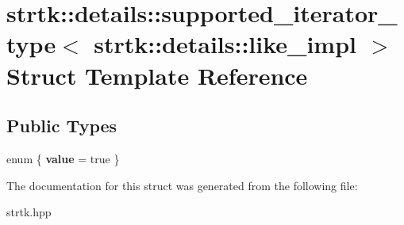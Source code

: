 \hypertarget{structstrtk_1_1details_1_1supported__iterator__type_3_01strtk_1_1details_1_1like__impl_01_4}{\section{strtk\-:\-:details\-:\-:supported\-\_\-iterator\-\_\-type$<$ strtk\-:\-:details\-:\-:like\-\_\-impl $>$ Struct Template Reference}
\label{structstrtk_1_1details_1_1supported__iterator__type_3_01strtk_1_1details_1_1like__impl_01_4}
}
\subsection*{Public Types}
\begin{DoxyCompactItemize}
\item 
enum \{ {\bfseries value} = true
 \}
\end{DoxyCompactItemize}


The documentation for this struct was generated from the following file\-:\begin{DoxyCompactItemize}
\item 
strtk.\-hpp\end{DoxyCompactItemize}
